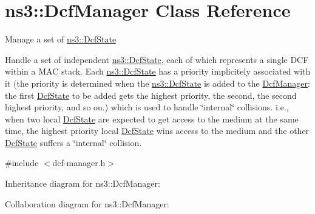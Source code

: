 \hypertarget{classns3_1_1DcfManager}{}\section{ns3\+:\+:Dcf\+Manager Class Reference}
\label{classns3_1_1DcfManager}


Manage a set of \hyperlink{classns3_1_1DcfState}{ns3\+::\+Dcf\+State}

Handle a set of independent \hyperlink{classns3_1_1DcfState}{ns3\+::\+Dcf\+State}, each of which represents a single D\+CF within a M\+AC stack. Each \hyperlink{classns3_1_1DcfState}{ns3\+::\+Dcf\+State} has a priority implicitely associated with it (the priority is determined when the \hyperlink{classns3_1_1DcfState}{ns3\+::\+Dcf\+State} is added to the \hyperlink{classns3_1_1DcfManager}{Dcf\+Manager}\+: the first \hyperlink{classns3_1_1DcfState}{Dcf\+State} to be added gets the highest priority, the second, the second highest priority, and so on.) which is used to handle \char`\"{}internal\char`\"{} collisions. i.\+e., when two local \hyperlink{classns3_1_1DcfState}{Dcf\+State} are expected to get access to the medium at the same time, the highest priority local \hyperlink{classns3_1_1DcfState}{Dcf\+State} wins access to the medium and the other \hyperlink{classns3_1_1DcfState}{Dcf\+State} suffers a \char`\"{}internal\char`\"{} collision.  




{\ttfamily \#include $<$dcf-\/manager.\+h$>$}



Inheritance diagram for ns3\+:\+:Dcf\+Manager\+:


Collaboration diagram for ns3\+:\+:Dcf\+Manager\+:
